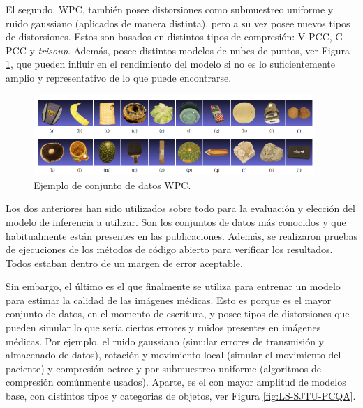 El segundo, WPC\cite{WPC1, WPC2}, también posee distorsiones como submuestreo uniforme y 
ruido gaussiano (aplicados de manera distinta), pero a su vez posee nuevos tipos 
de distorsiones. Estos son basados en distintos tipos de compresión: V-PCC, G-PCC y \emph{trisoup}.
Además, posee distintos modelos de nubes de puntos, ver Figura \ref{fig:WPC}, que 
pueden influir en el rendimiento del modelo si no es lo suficientemente amplio 
y representativo de lo que puede encontrarse. 

\begin{figure}[htp]
  \begin{center}
    \includegraphics[width=0.95\textwidth]{imagenes/chapter4/WPC}
  \end{center}
  \caption{Ejemplo de conjunto de datos WPC\cite{WPC1, WPC2}.}
  \label{fig:WPC}
\end{figure}

Los dos anteriores han sido utilizados sobre todo para la evaluación y elección 
del modelo de inferencia a utilizar. Son los conjuntos de datos más conocidos 
y que habitualmente están presentes en las publicaciones. Además, se realizaron 
pruebas de ejecuciones de los métodos de código abierto para verificar los 
resultados. Todos estaban dentro de un margen de error aceptable.

Sin embargo, el último es el que finalmente se utiliza para entrenar un modelo para estimar 
la calidad de las imágenes médicas. Esto es porque es el mayor conjunto de datos, 
en el momento de escritura, y posee tipos de distorsiones que pueden simular 
lo que sería ciertos errores y ruidos presentes en imágenes médicas. Por ejemplo, 
el ruido gaussiano (simular errores de transmisión y almacenado de datos), 
rotación y movimiento local (simular el movimiento del paciente) y compresión 
octree y por submuestreo uniforme (algoritmos de compresión comúnmente usados).
Aparte, es el con mayor amplitud de modelos base, con distintos tipos y categorias 
de objetos, ver Figura \ref{fig:LS-SJTU-PCQA}.

